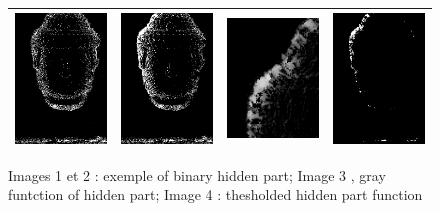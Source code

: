 \begin{figure}
\begin{tabular}{||c|c|c|c||}
   \hline \hline
   \includegraphics[width=40mm]{FIGS/Boudhas/MASQ_BRUTE_5588.jpg}  &
   \includegraphics[width=40mm]{FIGS/Boudhas/MASQ_BRUTE_5592.jpg}  &
   \includegraphics[width=40mm]{FIGS/Boudhas/MASQ_GRAY_5592.jpg}  &
   \includegraphics[width=40mm]{FIGS/Boudhas/MASQ_SEUIl_5592.jpg}  \\ \hline  \hline
\end{tabular}
\label{Hidden:part}
\caption{Images 1 et 2 : exemple of binary hidden part; Image 3 , gray funtction of hidden part; Image 4 : thesholded
hidden part function }
\end{figure}



